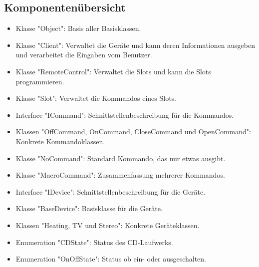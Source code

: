 \documentclass[12pt,a4paper]{article}
\begin{document}
\subsection {Komponentenübersicht}
\begin {itemize} 
	\item Klasse "Object":
	\newline
	Basis aller Basisklassen.
	
	\item Klasse "Client":
	\newline
	Verwaltet die Geräte und kann deren Informationen ausgeben und verarbeitet die Eingaben vom Benutzer.

	\item Klasse "RemoteControl":
	\newline
	Verwaltet die Slots und kann die Slots programmieren.

	\item Klasse "Slot":
	\newline
	Verwaltet die Kommandos eines Slots.

	\item Interface "ICommand":
	\newline
	Schnittstellenbeschreibung für die Kommandos.
	
	\item Klassen "OffCommand, OnCommand, CloseCommand und OpenCommand":
	\newline
	Konkrete Kommandoklassen.

	\item Klasse "NoCommand":
	\newline
	Standard Kommando, das nur etwas ausgibt.
	
	\item Klasse "MacroCommand":
	\newline
	Zusammenfassung mehrerer Kommandos.

	\item Interface "IDevice":
	\newline
	Schnittstellenbeschreibung für die Geräte.
	
	\item Klasse "BaseDevice":
	\newline
	Basisklasse für die Geräte.

	\item Klassen "Heating, TV und Stereo":
	\newline
	Konkrete Geräteklassen.

	\item Enumeration "CDState":
	\newline
	Status des CD-Laufwerks.

	\item Enumeration "OnOffState":
	\newline
	Status ob ein- oder ausgeschalten.

			
\end {itemize}
\end{document}
